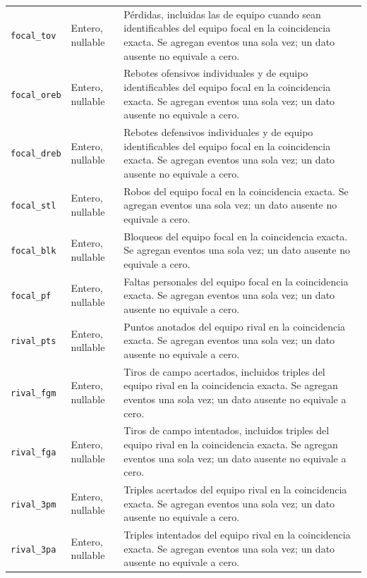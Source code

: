 \begin{longtable}{@{}>{\raggedright\arraybackslash}p{5.0cm}>{\raggedright\arraybackslash}p{1.9cm}>{\raggedright\arraybackslash}p{7.7cm}@{}}
\texttt{focal\_\allowbreak tov} & Entero, nullable & Pérdidas, incluidas las de equipo cuando sean identificables del equipo focal en la coincidencia exacta. Se agregan eventos una sola vez; un dato ausente no equivale a cero.\\
\texttt{focal\_\allowbreak oreb} & Entero, nullable & Rebotes ofensivos individuales y de equipo identificables del equipo focal en la coincidencia exacta. Se agregan eventos una sola vez; un dato ausente no equivale a cero.\\
\texttt{focal\_\allowbreak dreb} & Entero, nullable & Rebotes defensivos individuales y de equipo identificables del equipo focal en la coincidencia exacta. Se agregan eventos una sola vez; un dato ausente no equivale a cero.\\
\texttt{focal\_\allowbreak stl} & Entero, nullable & Robos del equipo focal en la coincidencia exacta. Se agregan eventos una sola vez; un dato ausente no equivale a cero.\\
\texttt{focal\_\allowbreak blk} & Entero, nullable & Bloqueos del equipo focal en la coincidencia exacta. Se agregan eventos una sola vez; un dato ausente no equivale a cero.\\
\texttt{focal\_\allowbreak pf} & Entero, nullable & Faltas personales del equipo focal en la coincidencia exacta. Se agregan eventos una sola vez; un dato ausente no equivale a cero.\\
\texttt{rival\_\allowbreak pts} & Entero, nullable & Puntos anotados del equipo rival en la coincidencia exacta. Se agregan eventos una sola vez; un dato ausente no equivale a cero.\\
\texttt{rival\_\allowbreak fgm} & Entero, nullable & Tiros de campo acertados, incluidos triples del equipo rival en la coincidencia exacta. Se agregan eventos una sola vez; un dato ausente no equivale a cero.\\
\texttt{rival\_\allowbreak fga} & Entero, nullable & Tiros de campo intentados, incluidos triples del equipo rival en la coincidencia exacta. Se agregan eventos una sola vez; un dato ausente no equivale a cero.\\
\texttt{rival\_\allowbreak 3pm} & Entero, nullable & Triples acertados del equipo rival en la coincidencia exacta. Se agregan eventos una sola vez; un dato ausente no equivale a cero.\\
\texttt{rival\_\allowbreak 3pa} & Entero, nullable & Triples intentados del equipo rival en la coincidencia exacta. Se agregan eventos una sola vez; un dato ausente no equivale a cero.\\

\end{longtable}
